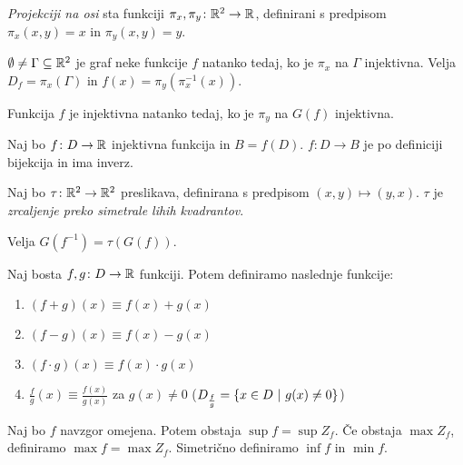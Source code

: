 \documentclass[12pt, a4paper]{article}
\begin{document}
\begin{definicija}
\emph{Projekciji na osi} sta funkciji $\pi_x,\pi_y\colon \mathbb{R}^2\to\mathbb{R}$, definirani s predpisom $\pi_x(x,y)=x$ in $\pi_y(x,y)=y$.
\end{definicija}

\begin{trditev}
$\emptyset\ne\Gamma\subseteq\mathbb{R}^2$ je graf neke funkcije $f$ natanko tedaj, ko je $\pi_x$ na $\Gamma$ injektivna. Velja $D_f=\pi_x(\Gamma)$ in $f(x)=\pi_y(\pi_x^{-1}(x)).$
\end{trditev}

\begin{trditev}
Funkcija $f$ je injektivna natanko tedaj, ko je $\pi_y$ na $G(f)$ injektivna.
\end{trditev}

\begin{trditev}
Naj bo $f\colon D\to\mathbb{R}$ injektivna funkcija in $B=f(D)$. $f\colon D\to B$ je po definiciji bijekcija in ima inverz.
\end{trditev}

\begin{definicija}
Naj bo $\tau\colon\mathbb{R}^2\to\mathbb{R}^2$ preslikava, definirana s predpisom $(x,y)\mapsto(y,x)$. $\tau$ je \emph{zrcaljenje preko simetrale lihih kvadrantov}.
\end{definicija}

\begin{trditev}
Velja $G(f^{-1})=\tau(G(f))$.
\end{trditev}

\begin{definicija}
Naj bosta $f, g\colon D\to\mathbb{R}$ funkciji. Potem definiramo naslednje funkcije:

\begin{enumerate}[label=\arabic*)]
\item $(f+g)(x)\equiv f(x)+g(x)$
\item $(f-g)(x)\equiv f(x)-g(x)$
\item $(f\cdot g)(x)\equiv f(x)\cdot g(x)$
\item $\frac{f}{g}(x)\equiv \frac{f(x)}{g(x)}$ za $g(x)\ne 0$ ($D_{\frac{f}{g}}=\left\{x\in D~\middle\vert~g(x)\ne 0\right\}$)
\end{enumerate}
\end{definicija}

\begin{definicija}
Naj bo $f$ navzgor omejena. Potem obstaja $\sup f =\sup Z_f$. Če obstaja $\max Z_f$, definiramo $\max f=\max Z_f$. Simetrično definiramo $\inf f$ in $\min f$.
\end{definicija}
\end{document}
